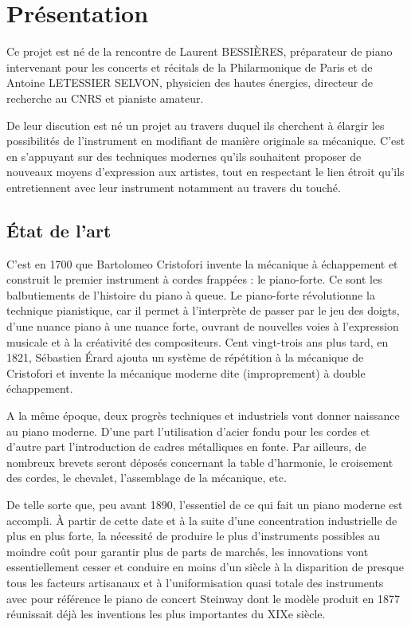 \documentclass[french,a4paper,12pt]{report}
\begin{document}
  \chapter{Présentation}
  
  Ce projet est né de la rencontre de Laurent BESSIÈRES, préparateur de piano intervenant pour les concerts et récitals de la Philarmonique de Paris et de Antoine LETESSIER SELVON, physicien des hautes énergies, directeur de recherche au CNRS et pianiste amateur. 
  
  De leur discution est né un projet au travers duquel ils cherchent à élargir les possibilités de l'instrument en modifiant de manière originale sa mécanique. C'est en s'appuyant sur des techniques modernes qu'ils souhaitent proposer de nouveaux moyens d'expression aux artistes, tout en respectant le lien étroit qu'ils entretiennent avec leur instrument notamment au travers du touché.
  
  \section{État de l'art}
  
  C’est en 1700 que Bartolomeo Cristofori invente la mécanique à échappement et construit le premier instrument à cordes frappées : le piano-forte. Ce sont les balbutiements de l’histoire du piano à queue. Le piano-forte révolutionne la technique pianistique, car il permet à l’interprète de passer par le jeu des doigts, d’une nuance piano à une nuance forte, ouvrant de nouvelles voies à l’expression musicale et à la créativité des compositeurs. Cent vingt-trois ans plus tard, en 1821, Sébastien Érard ajouta un système de répétition à la mécanique de Cristofori et invente la mécanique moderne dite (improprement) à double échappement.

A la même époque, deux progrès techniques et industriels vont donner naissance au piano moderne. D’une part l’utilisation d’acier fondu pour les cordes et d’autre part l’introduction de cadres métalliques en fonte. Par ailleurs, de nombreux brevets seront déposés concernant la table d’harmonie, le croisement des cordes, le chevalet, l’assemblage de la mécanique, etc. 

De telle sorte que, peu avant 1890, l’essentiel de ce qui fait un piano moderne est accompli. À partir de cette date et à la suite d’une concentration industrielle de plus en plus forte, la nécessité de produire le plus d’instruments possibles au moindre coût pour garantir plus de parts de marchés, les innovations vont essentiellement cesser et conduire en moins d’un siècle à la disparition de presque tous les facteurs artisanaux et à l’uniformisation quasi totale des instruments avec pour référence le piano de concert Steinway dont le modèle produit en 1877 réunissait déjà les inventions les plus importantes du XIXe siècle.
\end{document}
